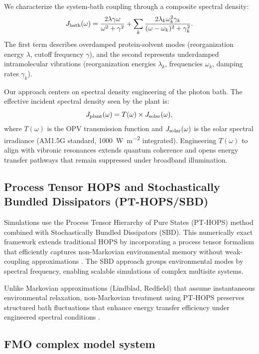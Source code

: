 We characterize the system-bath coupling through a composite spectral density:
\begin{equation}\label{eq:spectral_density}
J_{\rm bath}(\omega) = \frac{2\lambda\gamma\omega}{\omega^2 + \gamma^2} + \sum_k \frac{2\lambda_k\omega_k^2\gamma_k}{(\omega-\omega_k)^2 + \gamma_k^2}.
\end{equation}
The first term describes overdamped protein-solvent modes (reorganization energy $\lambda$, cutoff frequency $\gamma$), and the second represents underdamped intramolecular vibrations (reorganization energies $\lambda_k$, frequencies $\omega_k$, damping rates $\gamma_k$).

Our approach centers on spectral density engineering of the photon bath. The effective incident spectral density seen by the plant is:
\begin{equation}\label{eq:filtered_spectral_density}
J_{\rm plant}(\omega) = T(\omega) \times J_{\rm solar}(\omega),
\end{equation}
where $T(\omega)$ is the OPV transmission function and $J_{\rm solar}(\omega)$ is the solar spectral irradiance (AM1.5G standard, \SI{1000}{\watt\per\metre\squared} integrated). Engineering $T(\omega)$ to align with vibronic resonances extends quantum coherence and opens energy transfer pathways that remain suppressed under broadband illumination.

\subsection{Process Tensor HOPS and Stochastically Bundled Dissipators (PT-HOPS/SBD)}

Simulations use the Process Tensor Hierarchy of Pure States (PT-HOPS) method combined with Stochastically Bundled Dissipators (SBD). This numerically exact framework extends traditional HOPS by incorporating a process tensor formalism that efficiently captures non-Markovian environmental memory without weak-coupling approximations \cite{Suess2014, Citty2024a, Chen2022, Varvelo2021a}. The SBD approach groups environmental modes by spectral frequency, enabling scalable simulations of complex multisite systems.

Unlike Markovian approximations (Lindblad, Redfield) that assume instantaneous environmental relaxation, non-Markovian treatment using PT-HOPS preserves structured bath fluctuations that enhance energy transfer efficiency under engineered spectral conditions \cite{Scholes2011, Huelga2013}.

\subsection{FMO complex model system}

